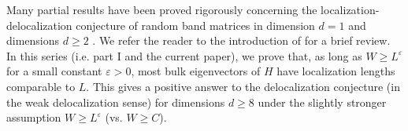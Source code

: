 \documentclass{article}
\newcommand{\1}{\mathds{1}}
\numberwithin{equation}{section}
\newcommand{\e}{{\varepsilon}}
\newcommand{\ii}{\mathrm{i}} %
\renewcommand{\geq}{\geqslant}
\renewcommand{\ge}{\geq}
\theoremstyle{plain} %
\theoremstyle{remark}
\begin{document}
Many partial results have been proved rigorously concerning the localization-delocalization conjecture of random band matrices in dimension $d=1$ \cite{BaoErd2015,Semicircle, ErdKno2013,ErdKno2011,delocal,HeMa2018,BouErdYauYin2017,PartI,PartII,PartIII,Sch2009,PelSchShaSod,Sod2010,SchMT,Sch1,Sch2,Sch3,1Dchara,Sch2014} and dimensions $d\ge 2$ \cite{ErdKno2013,ErdKno2011,delocal, HeMa2018,PartIII}. We refer the reader to the introduction of \cite{PartI_high} for a brief review.   
In this series (i.e. part I \cite{PartI_high} and the current paper), we prove that, as long as $W\ge L^\e$ for a small constant $\e>0$, most bulk eigenvectors of $H$ have localization lengths comparable to $L$. This gives a positive answer to the delocalization conjecture (in the weak delocalization sense) for dimensions $d \ge 8$ under the slightly stronger assumption $W\ge L^\e$ (vs. $W\ge C$). 
\end{document}
